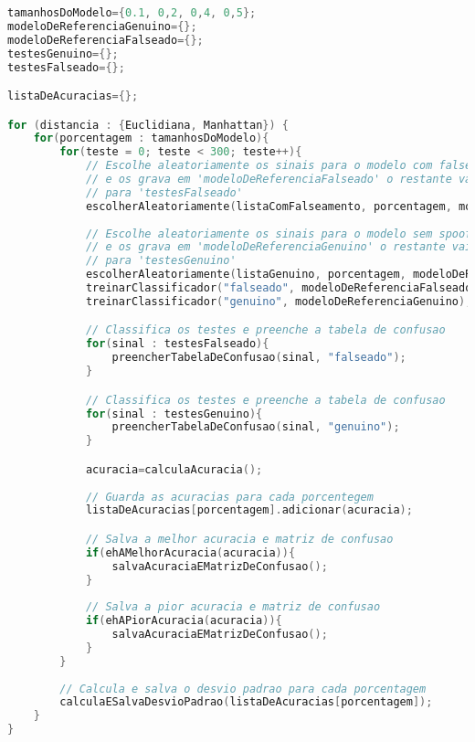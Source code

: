 \begin{lstlisting}[language=C++, caption={Algoritmo que caracteriza o procedimento 02}, captionpos=t,  label={lst:experiment02Algo}]
tamanhosDoModelo={0.1, 0,2, 0,4, 0,5};
modeloDeReferenciaGenuino={};
modeloDeReferenciaFalseado={};
testesGenuino={};
testesFalseado={};

listaDeAcuracias={};

for (distancia : {Euclidiana, Manhattan}) {
	for(porcentagem : tamanhosDoModelo){
		for(teste = 0; teste < 300; teste++){
			// Escolhe aleatoriamente os sinais para o modelo com falseamento 
			// e os grava em 'modeloDeReferenciaFalseado' o restante vai 
			// para 'testesFalseado'
			escolherAleatoriamente(listaComFalseamento, porcentagem, modeloDeReferenciaFalseado, testesFalseado);
			
			// Escolhe aleatoriamente os sinais para o modelo sem spoofing
			// e os grava em 'modeloDeReferenciaGenuino' o restante vai 
			// para 'testesGenuino'
			escolherAleatoriamente(listaGenuino, porcentagem, modeloDeReferenciaGenuino, testesGenuino);
			treinarClassificador("falseado", modeloDeReferenciaFalseado);
			treinarClassificador("genuino", modeloDeReferenciaGenuino);

			// Classifica os testes e preenche a tabela de confusao
			for(sinal : testesFalseado){
				preencherTabelaDeConfusao(sinal, "falseado");
			} 

			// Classifica os testes e preenche a tabela de confusao
			for(sinal : testesGenuino){
				preencherTabelaDeConfusao(sinal, "genuino");
			}

			acuracia=calculaAcuracia();
			
			// Guarda as acuracias para cada porcentegem
			listaDeAcuracias[porcentagem].adicionar(acuracia);

			// Salva a melhor acuracia e matriz de confusao
			if(ehAMelhorAcuracia(acuracia)){
				salvaAcuraciaEMatrizDeConfusao();
			}
			
			// Salva a pior acuracia e matriz de confusao
			if(ehAPiorAcuracia(acuracia)){
				salvaAcuraciaEMatrizDeConfusao();
			}
		}
		
		// Calcula e salva o desvio padrao para cada porcentagem
		calculaESalvaDesvioPadrao(listaDeAcuracias[porcentagem]);
	}
}				
\end{lstlisting}